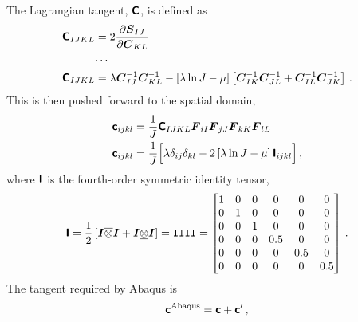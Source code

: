 \documentclass[10pt,letterpaper,oneside]{report}
\newcommand{\ten}[1]{\mbox{\boldmath $#1$}{}}
\newcommand{\tenf}[1]{\mbox{{\sffamily{\bfseries {#1}}}}}
\newcommand{\scas}[1]{\mbox{{\scriptsize{${\rm{#1}}$}}}{}}
\begin{document}
The Lagrangian tangent, $\tenf{C}$, is defined as
\begin{align}
\tenf{C}_{IJKL} ={}& 2 \frac{\partial \ten{S}_{IJ} }{\partial \ten{C}_{KL} }  
\\
\cdots{}& \notag \\
\tenf{C}_{IJKL} ={}& \lambda \ten{C}^{-1}_{IJ} \ten{C}^{-1}_{KL} - \left[ \lambda \ln J - \mu \right] \left[ \ten{C}^{-1}_{IK} \ten{C}^{-1}_{JL} + \ten{C}^{-1}_{IL} \ten{C}^{-1}_{JK} \right]  \, . 
\end{align}
This is then pushed forward to the spatial domain, 
\begin{align}
\tenf{c}_{ijkl} ={}& \frac{1}{J} \tenf{C}_{IJKL} \ten{F}_{iI} \ten{F}_{jJ} \ten{F}_{kK} \ten{F}_{lL} 
\\
\tenf{c}_{ijkl} ={}& \frac{1}{J} \Big[ \lambda \delta_{ij} \delta_{kl} - 2 \left[ \lambda \ln J - \mu \right] \tenf{I}_{ijkl} \Big] \, , 
\end{align}
where $\tenf{I}$ is the fourth-order symmetric identity tensor,
\begin{equation}
\tenf{I} 
= \frac{1}{2} \left[ \ten{I} \overline{\otimes} \ten{I} + \ten{I} \underline{\otimes} \ten{I} \right] 
= \mathtt{IIII} 
= \begin{bmatrix}
1 & 0 & 0 & 0   & 0   & 0 \\
0 & 1 & 0 & 0   & 0   & 0 \\
0 & 0 & 1 & 0   & 0   & 0 \\
0 & 0 & 0 & 0.5 & 0   & 0 \\
0 & 0 & 0 & 0   & 0.5 & 0 \\
0 & 0 & 0 & 0   & 0   & 0.5 \\
\end{bmatrix} \, . 
\end{equation}
The tangent required by Abaqus is
\begin{equation}
\tenf{c}^{\scas{Abaqus}} = \tenf{c} + \tenf{c}' \, , 
\end{equation}
\end{document}

